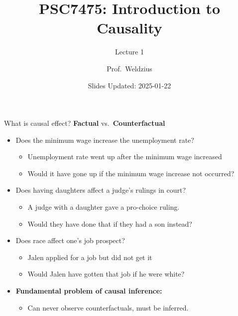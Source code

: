 \documentclass[
  ignorenonframetext,
]{beamer}
\title{PSC7475: Introduction to Causality}
\subtitle{Lecture 1}
\author{Prof.~Weldzius}
\date{Slides Updated: 2025-01-22}
\institute{Villanova University}
\providecommand{\tightlist}{%
  \setlength{\itemsep}{0pt}\setlength{\parskip}{0pt}}
\begin{document}
\frame{\titlepage}

\begin{frame}{What is causal effect?}
\label{what-is-causal-effect}
\textbf{Factual} vs.~\textbf{Counterfactual} \pause 

\begin{itemize}
\item
  Does the minimum wage increase the unemployment rate? \pause 

  \begin{itemize}
  \tightlist
  \item
    Unemployment rate went up after the minimum wage increased \pause 
  \item
    Would it have gone up if the minimum wage increase not occurred?
    \pause 
  \end{itemize}
\item
  Does having daughters affect a judge's rulings in court? \pause 

  \begin{itemize}
  \tightlist
  \item
    A judge with a daughter gave a pro-choice ruling.\pause 
  \item
    Would they have done that if they had a son instead? \pause 
  \end{itemize}
\item
  Does race affect one's job prospect? \pause 

  \begin{itemize}
  \tightlist
  \item
    Jalen applied for a job but did not get it \pause 
  \item
    Would Jalen have gotten that job if he were white? \pause 
  \end{itemize}
\item
  \textbf{Fundamental problem of causal inference:} \pause 

  \begin{itemize}
  \tightlist
  \item
    Can never observe counterfactuals, must be inferred.
  \end{itemize}
\end{itemize}
\end{frame}
\end{document}
